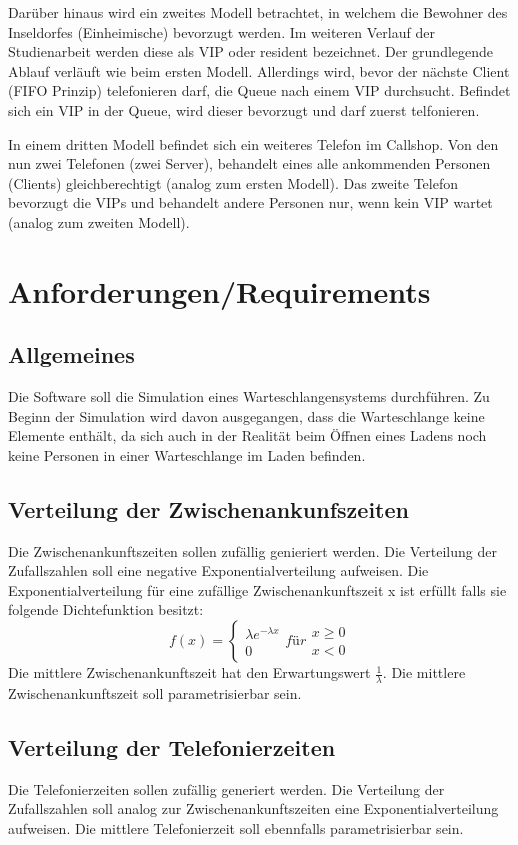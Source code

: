 Darüber hinaus wird ein zweites Modell betrachtet, in welchem die Bewohner des Inseldorfes (Einheimische) bevorzugt werden. Im weiteren Verlauf der Studienarbeit werden diese als VIP oder resident bezeichnet. Der grundlegende Ablauf verläuft wie beim ersten Modell. Allerdings wird, bevor der nächste Client (FIFO Prinzip) telefonieren darf, die Queue nach einem VIP durchsucht. Befindet sich ein VIP in der Queue, wird dieser bevorzugt und darf zuerst telfonieren. 

In einem dritten Modell befindet sich ein weiteres Telefon im Callshop. Von den nun zwei Telefonen (zwei Server), behandelt eines alle ankommenden Personen (Clients) gleichberechtigt (analog zum ersten Modell). Das zweite Telefon bevorzugt die VIPs und behandelt andere Personen nur, wenn kein VIP wartet (analog zum zweiten Modell).

\section{Anforderungen/Requirements}
\label{requirements}
\subsection{Allgemeines}
Die Software soll die Simulation eines Warteschlangensystems durchführen. Zu Beginn der Simulation wird davon ausgegangen, dass die Warteschlange keine Elemente enthält, da sich auch in der Realität beim Öffnen eines Ladens noch keine Personen in einer Warteschlange im Laden befinden.
\subsection{Verteilung der Zwischenankunfszeiten}
Die Zwischenankunftszeiten sollen zufällig genieriert werden. Die Verteilung der Zufallszahlen soll eine negative Exponentialverteilung aufweisen. Die Exponentialverteilung für eine zufällige Zwischenankunftszeit x ist erfüllt falls sie folgende Dichtefunktion besitzt:
$$
f(x) = \left\{\begin{matrix}
\lambda e^{-\lambda x}
\\ 
0  
\end{matrix}\right.für \begin{matrix}
x \geqslant 0
\\ 
x < 0
\end{matrix}
$$
Die mittlere Zwischenankunftszeit hat den Erwartungswert $\frac{1}{\lambda}$. Die mittlere Zwischenankunftszeit soll parametrisierbar sein. 
\subsection{Verteilung der Telefonierzeiten}
Die Telefonierzeiten sollen zufällig generiert werden. Die Verteilung der Zufallszahlen soll analog zur Zwischenankunftszeiten eine Exponentialverteilung aufweisen. Die mittlere Telefonierzeit soll ebennfalls parametrisierbar sein.

